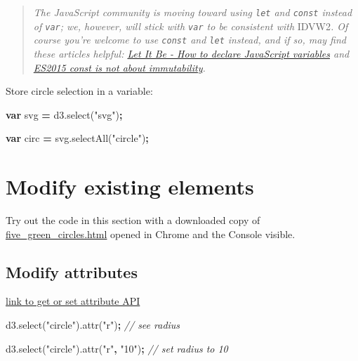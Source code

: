 \documentclass[openany]{book}
\newenvironment{Shaded}{\begin{snugshade}}{\end{snugshade}}
\newcommand{\AttributeTok}[1]{\textcolor[rgb]{0.77,0.63,0.00}{#1}}
\newcommand{\CommentTok}[1]{\textcolor[rgb]{0.56,0.35,0.01}{\textit{#1}}}
\newcommand{\KeywordTok}[1]{\textcolor[rgb]{0.13,0.29,0.53}{\textbf{#1}}}
\newcommand{\NormalTok}[1]{#1}
\newcommand{\OperatorTok}[1]{\textcolor[rgb]{0.81,0.36,0.00}{\textbf{#1}}}
\newcommand{\StringTok}[1]{\textcolor[rgb]{0.31,0.60,0.02}{#1}}
\newcommand{\VariableTok}[1]{\textcolor[rgb]{0.00,0.00,0.00}{#1}}
\begin{document}
\begin{quote}
 \emph{The JavaScript community is moving toward using \texttt{let} and \texttt{const} instead of \texttt{var}; we, however, will stick with \texttt{var} to be consistent with }IDVW2\emph{. Of course you're welcome to use \texttt{const} and \texttt{let} instead, and if so, may find these articles helpful: \href{https://madhatted.com/2016/1/25/let-it-be}{Let It Be - How to declare JavaScript variables} and \href{https://mathiasbynens.be/notes/es6-const}{ES2015 const is not about immutability}.}
\end{quote}

Store circle selection in a variable:

\begin{Shaded}
\begin{Highlighting}[]
\KeywordTok{var}\NormalTok{ svg }\OperatorTok{=} \VariableTok{d3}\NormalTok{.}\AttributeTok{select}\NormalTok{(}\StringTok{"svg"}\NormalTok{)}\OperatorTok{;}

\KeywordTok{var}\NormalTok{ circ }\OperatorTok{=} \VariableTok{svg}\NormalTok{.}\AttributeTok{selectAll}\NormalTok{(}\StringTok{"circle"}\NormalTok{)}\OperatorTok{;}
\end{Highlighting}
\end{Shaded}

\hypertarget{modify-existing-elements}{%
\section{Modify existing elements }\label{modify-existing-elements}}

Try out the code in this section with a downloaded copy of \href{https://raw.githubusercontent.com/jtr13/d3book/master/code/five_green_circles.html}{five\_green\_circles.html} opened in Chrome and the Console visible.

\hypertarget{modify-attributes}{%
\subsection{Modify attributes}\label{modify-attributes}}

\href{https://github.com/d3/d3-selection/blob/v1.4.0/README.md\#selection_attr}{link to get or set attribute API}

\begin{Shaded}
\begin{Highlighting}[]
\VariableTok{d3}\NormalTok{.}\AttributeTok{select}\NormalTok{(}\StringTok{"circle"}\NormalTok{).}\AttributeTok{attr}\NormalTok{(}\StringTok{"r"}\NormalTok{)}\OperatorTok{;}           \CommentTok{// see radius}

\VariableTok{d3}\NormalTok{.}\AttributeTok{select}\NormalTok{(}\StringTok{"circle"}\NormalTok{).}\AttributeTok{attr}\NormalTok{(}\StringTok{"r"}\OperatorTok{,} \StringTok{"10"}\NormalTok{)}\OperatorTok{;}     \CommentTok{// set radius to 10}
\end{Highlighting}
\end{Shaded}
\end{document}
